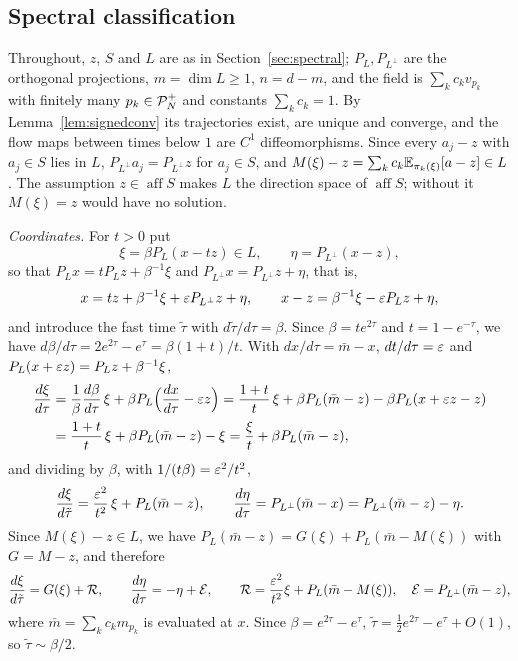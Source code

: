 \documentclass{article} %
\makeatletter
\newif\ificlr
\newcommand{\placeblock}[1]{\ificlr\@nameuse{moved@#1}\fi}
\theoremstyle{plain}
\theoremstyle{definition}
\theoremstyle{remark}
\makeatother
\begin{document}
\subsection{Spectral classification}
\label{apx:pf-spectral}

\ificlr\placeblock{spectraldefs}

Throughout, $z$, $S$ and $L$ are as above\else Throughout, $z$, $S$ and $L$ are as in Section~\ref{sec:spectral}\fi; $P_L,P_{L^\perp}$ are the
orthogonal projections, $m=\dim L\ge1$, $n=d-m$, and the field is
$\sum_kc_kv_{p_k}$ with finitely many $p_k\in\mathcal{P}_N^{+}$ and constants $\sum_kc_k=1$. By
Lemma~\ref{lem:signedconv} its trajectories exist, are unique and converge, and the flow maps
between times below $1$ are $C^1$ diffeomorphisms. Since every $a_j-z$ with $a_j\in S$ lies in
$L$, $P_{L^\perp}a_j=P_{L^\perp}z$ for $a_j\in S$, and $M(\xi)-z=\sum_kc_k\mathbb{E}_{\pi_k(\xi)}[a-z]\in L$.
The assumption $z\in\operatorname{aff}S$ makes $L$ the direction space of $\operatorname{aff}S$;
without it $M(\xi)=z$ would have no solution.

\emph{Coordinates.} For $t>0$ put
\[
\xi=\beta P_L(x-tz)\in L,\qquad \eta=P_{L^\perp}(x-z),
\]
so that $P_Lx=tP_Lz+\beta^{-1}\xi$ and $P_{L^\perp}x=P_{L^\perp}z+\eta$, that is,
\[
x=tz+\beta^{-1}\xi+\varepsilon P_{L^\perp}z+\eta,\qquad x-z=\beta^{-1}\xi-\varepsilon P_Lz+\eta,
\]
and introduce the fast time $\tilde\tau$ with $d\tilde\tau/d\tau=\beta$. Since $\beta=te^{2\tau}$ and
$t=1-e^{-\tau}$, we have $d\beta/d\tau=2e^{2\tau}-e^\tau=\beta(1+t)/t$. With $dx/d\tau=\bar m-x$,
$dt/d\tau=\varepsilon$ and $P_L(x+\varepsilon z)=P_Lz+\beta^{-1}\xi$,
\begin{align*}
\frac{d\xi}{d\tau}
&=\frac{1}{\beta}\frac{d\beta}{d\tau}\,\xi+\beta P_L\Bigl(\frac{dx}{d\tau}-\varepsilon z\Bigr)
=\frac{1+t}{t}\,\xi+\beta P_L(\bar m-z)-\beta P_L(x+\varepsilon z-z)\\
&=\frac{1+t}{t}\,\xi+\beta P_L(\bar m-z)-\xi
=\frac{\xi}{t}+\beta P_L(\bar m-z),
\end{align*}
and dividing by $\beta$, with $1/(t\beta)=\varepsilon^2/t^2$,
\[
\frac{d\xi}{d\tilde\tau}=\frac{\varepsilon^2}{t^2}\,\xi+P_L(\bar m-z),\qquad
\frac{d\eta}{d\tau}=P_{L^\perp}(\bar m-x)=P_{L^\perp}(\bar m-z)-\eta .
\]
Since $M(\xi)-z\in L$, we have $P_L(\bar m-z)=G(\xi)+P_L(\bar m-M(\xi))$ with $G=M-z$, and therefore
\begin{equation}
\frac{d\xi}{d\tilde\tau}=G(\xi)+\mathcal R,\qquad
\frac{d\eta}{d\tau}=-\eta+\mathcal E,\qquad
\mathcal R=\frac{\varepsilon^2}{t^2}\xi+P_L(\bar m-M(\xi)),\quad \mathcal E=P_{L^\perp}(\bar m-z),
\label{eq:pf:spec:blowup}
\end{equation}
where $\bar m=\sum_kc_km_{p_k}$ is evaluated at $x$. Since $\beta=e^{2\tau}-e^\tau$,
$\tilde\tau=\tfrac12e^{2\tau}-e^\tau+O(1)$, so $\tilde\tau\sim\beta/2$.
\end{document}
